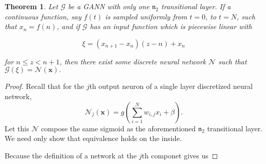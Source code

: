 \documentclass{article}
\newtheorem{theorem}{Theorem}
\begin{document}
\begin{theorem}
  Let $\mathcal{G}$ be a GANN with only one $\mathfrak{n}_2$ transitional layer. If a continuous function, say $f(t)$ is sampled uniformly from $t = 0$, to $t = N$, such that $x_n = f(n)$, and if $\mathcal{G}$ has an input function which is piecewise linear with

  \begin{equation}
  \xi = \left(x_{n+1} - x_n\right)\left(z - n\right) + x_n
  \end{equation}

  for $n \leq z < n+1$, then there exist some discrete neural network $\mathcal{N}$ such that $\mathcal{G}(\xi) = \mathcal{N}(\pmb{x}).$
\end{theorem}
\begin{proof}
  Recall that for the $j$th output neuron of a single layer discretized neural network,
  \begin{equation}
    \mathcal{N}_j(\pmb{x}) = g\left(\sum^N_{i=1}w_{i,j}x_i + \beta\right).
  \end{equation}
  Let this $\mathcal{N}$ compose the same sigmoid as the aforementioned $\mathfrak{n}_2$ transitional layer. We need only show that equivalence holds on the inside.


  Because the definition of a network at the $j$th componet gives us


\end{proof}
\end{document}
